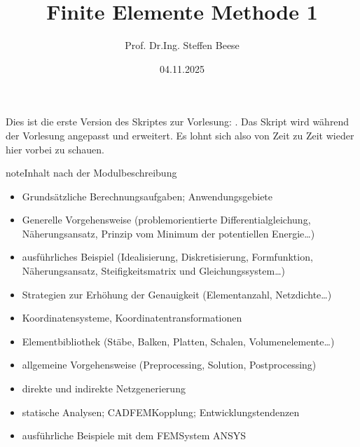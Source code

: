 \documentclass[letterpaper,10pt,german]{jupyterBook}
\title{Finite Elemente Methode 1}
\date{04.11.2025}
\author{Prof.\@{} Dr.\sphinxhyphen{}Ing.\@{} Steffen Beese}
\begin{document}
\pagestyle{empty}
\sphinxmaketitle
\pagestyle{plain}
\sphinxtableofcontents
\pagestyle{normal}
\label{\detokenize{intro::doc}}


\sphinxAtStartPar
Dies ist die erste Version des Skriptes zur Vorlesung: . Das Skript wird während der Vorlesung angepasst und erweitert. Es lohnt sich also von Zeit zu Zeit wieder hier vorbei zu schauen.

\begin{sphinxadmonition}{note}{Inhalt nach der Modulbeschreibung}
\begin{itemize}
\item {} 
\sphinxAtStartPar
Grundsätzliche Berechnungsaufgaben; Anwendungsgebiete

\item {} 
\sphinxAtStartPar
Generelle Vorgehensweise (problemorientierte Differentialgleichung,
Näherungsansatz, Prinzip vom Minimum der potentiellen Energie…)

\item {} 
\sphinxAtStartPar
ausführliches Beispiel (Idealisierung, Diskretisierung, Formfunktion,
Näherungsansatz, Steifigkeitsmatrix und Gleichungssystem…)

\item {} 
\sphinxAtStartPar
Strategien zur Erhöhung der Genauigkeit (Elementanzahl,
Netzdichte…)

\item {} 
\sphinxAtStartPar
Koordinatensysteme, Koordinatentransformationen

\item {} 
\sphinxAtStartPar
Elementbibliothek (Stäbe, Balken, Platten, Schalen,
Volumenelemente…)

\item {} 
\sphinxAtStartPar
allgemeine Vorgehensweise (Preprocessing, Solution, Postprocessing)

\item {} 
\sphinxAtStartPar
direkte und indirekte Netzgenerierung

\item {} 
\sphinxAtStartPar
statische Analysen; CAD\sphinxhyphen{}FEM\sphinxhyphen{}Kopplung; Entwicklungstendenzen

\item {} 
\sphinxAtStartPar
ausführliche Beispiele mit dem FEM\sphinxhyphen{}System ANSYS

\end{itemize}
\end{sphinxadmonition}
\end{document}
